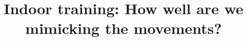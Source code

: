 \documentclass{style/nsf}
\begin{document}

\title{Indoor training: \newline How well are we mimicking the movements? }



\newpage{}


\newpage{}
\renewcommand\refname{References Cited}


\newpage{}


\newpage{}


\newpage{}


\newpage{}


\newpage{}

\newpage{}


\newpage{}

\end{document}
